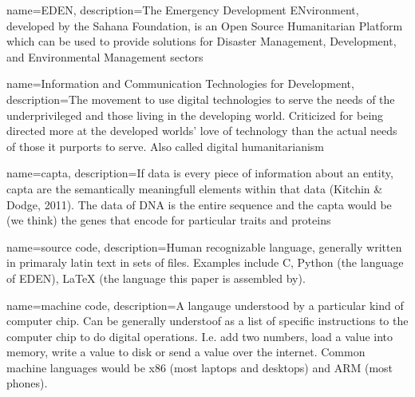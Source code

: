 {
   name=EDEN,
   description={The Emergency Development ENvironment, developed by the Sahana Foundation, is an Open Source Humanitarian Platform which can be used to provide solutions for Disaster Management, Development, and Environmental Management sectors}
}

{
   name=Information and Communication Technologies for Development,
   description={The movement to use digital technologies to serve the needs of the underprivileged and those living in the developing world. Criticized for being directed more at the developed worlds' love of technology than the actual needs of those it purports to serve. Also called digital humanitarianism}
}

{
   name=capta,
   description={If data is every piece of information about an entity, capta are the semantically meaningfull elements within that data (Kitchin \& Dodge, 2011). The data of DNA is the entire sequence and the capta would be (we think) the genes that encode for particular traits and proteins}
}

{
   name=source code,
   description={Human recognizable language, generally written in primaraly latin text in sets of files. Examples include C, Python (the language of EDEN), LaTeX (the language this paper is assembled by).}
}

{
   name=machine code,
   description={A langauge understood by a particular kind of computer chip. Can be generally understoof as a list of specific instructions to the computer chip to do digital operations. I.e. add two numbers, load a value into memory, write a value to disk or send a value over the internet. Common machine languages would be x86 (most laptops and desktops) and ARM (most phones).}
}

